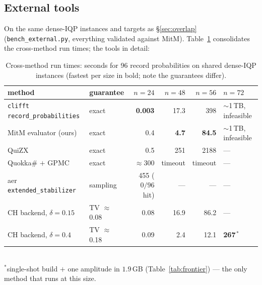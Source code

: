 \documentclass[11pt]{article}
\begin{document}
\subsection{External tools}\label{sec:external}
On the same dense-IQP instances and targets as \S\ref{sec:overlap}
(\texttt{bench\_external.py}, everything validated against MitM).
Table~\ref{tab:xmethod} consolidates the cross-method run times; the tools
in detail:

\begin{table}[h]\centering
\caption{Cross-method run times: seconds for 96 record probabilities on
shared dense-IQP instances (fastest per size in bold; note the guarantees
differ).}\label{tab:xmethod}
\begin{tabular}{llrrrl}
\toprule
method & guarantee & $n{=}24$ & $n{=}48$ & $n{=}56$ & $n{=}72$ \\
\midrule
\texttt{clifft} \texttt{record\_probabilities} & exact & \textbf{0.003} & 17.3 & 398 & $\sim$1\,TB, infeasible \\
MitM evaluator (ours) & exact & 0.4 & \textbf{4.7} & \textbf{84.5} & $\sim$1\,TB, infeasible \\
QuiZX & exact & 0.5 & 251 & 2188 & --- \\
Quokka\# $+$ GPMC & exact & $\approx$300 & timeout & timeout & --- \\
aer \texttt{extended\_stabilizer} & sampling & 455 ($0/96$ hit) & --- & --- & --- \\
CH backend, $\delta{=}0.15$ & TV $\approx$ 0.08 & 0.08 & 16.9 & 86.2 & --- \\
CH backend, $\delta{=}0.4$ & TV $\approx$ 0.18 & 0.09 & 2.4 & 12.1 & \textbf{267}$^{\,*}$ \\
\bottomrule
\end{tabular}\\[2pt]
{\small $^*$single-shot build $+$ one amplitude in $1.9$\,GB
(Table~\ref{tab:frontier}) --- the only method that runs at this size.}
\end{table}
\end{document}

